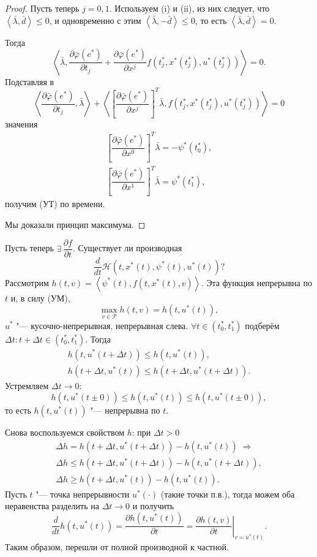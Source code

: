 \documentclass[12pt, a4paper]{article}
\theoremstyle{rusdef}
\renewcommand{\P}{\mathscr{P}} %
\renewcommand{\H}{\mathcal{H}} %
\renewcommand{\d}{\partial} %
\DeclareMathOperator*{\thus}{\Rightarrow} %
\begin{document}
\begin{proof}
  Пусть теперь $j = 0, 1$. Используем (i) и (ii), из них следует, что $\left<\bar{\lambda}, \bar{d} \right> \leqslant 0$, и одновременно с этим $\left<\bar{\lambda}, -\bar{d} \right> \leqslant 0$, то есть $\left<\bar{\lambda}, \bar{d} \right> = 0$.

  Тогда
  \[
    \left< \bar{\lambda}, \dfrac{\d \bar{\varphi}(e^*)}{\d t_j} + \dfrac{\d \bar{\varphi}(e^*)}{\d x^j} f(t_j^*, x^*(t_j^*), u^*(t_j^*)) \right> = 0.
  \]
  Подставляя в
  \[
    \left< \dfrac{\d \bar{\varphi}(e^*)}{\d t_j}, \bar{\lambda} \right> + \left< \left[\dfrac{\d \bar{\varphi}(e^*)}{\d x^j}\right]^T \bar{\lambda}, f(t_j^*, x^*(t_j^*), u^*(t_j^*)) \right> = 0
  \]
  значения
  \begin{gather*}
    \left[\dfrac{\d \bar{\varphi}(e^*)}{\d x^0}\right]^T \bar{\lambda} = -\psi^*(t_0^*),\\
    \left[\dfrac{\d \bar{\varphi}(e^*)}{\d x^1}\right]^T \bar{\lambda} = \psi^*(t_1^*),
  \end{gather*}
  получим (УТ) по времени.

  Мы доказали принцип максимума.
\end{proof}

Пусть теперь $\exists\, \dfrac{\d f}{\d t}$. Существует ли производная 
\[
  \dfrac{d}{dt} \H(t, x^*(t), \psi^*(t), u^*(t))?
\]
Рассмотрим $h(t, v) = \left< \psi^*(t), f(t, x^*(t), v) \right>$. Эта функция непрерывна по $t$ и, в силу (УМ),
\[
  \max\limits_{v \in \P} h(t,v) = h(t, u^*(t)),
\]
$u^*$ "--- кусочно-непрерывная, непрерывная слева.
$\forall t \in (t_0^*, t_1^*)$ подберём $\Delta t \colon t + \Delta t \in (t_0^*, t_1^*)$. Тогда
\begin{gather*}
  h(t, u^*(t + \Delta t)) \leqslant h(t, u^*(t)), \\
  h(t + \Delta t, u^*(t)) \leqslant h(t + \Delta t, u^*(t + \Delta t)).
\end{gather*}
Устремляем $\Delta t \to 0$:
\[
  h(t, u^*(t \pm 0)) \leqslant h(t, u^*(t)) \leqslant h(t, u^*(t \pm 0)),
\]
то есть $h(t, u^*(t))$ "--- непрерывна по $t$.

Снова воспользуемся свойством $h$: при $\Delta t > 0$
\begin{gather*}
  \Delta h = h(t + \Delta t, u^*(t + \Delta t)) - h(t, u^*(t)) \;\thus \\
  \Delta h \leqslant h(t + \Delta t, u^*(t + \Delta t)) - h(t, u^*(t + \Delta t)), \\
  \Delta h \geqslant h(t + \Delta t, u^*(t)) - h(t, u^*(t)).
\end{gather*}
Пусть $t$ "--- точка непрерывности $u^*(\cdot)$ (такие точки п.в.), тогда можем оба неравенства разделить на $\Delta t \to 0$ и получить
\[
  \dfrac{d}{dt} h(t, u^*(t)) = \dfrac{\d h(t, u^*(t))}{\d t} = \left. \dfrac{\d h(t, v)}{\d t} \right\vert_{v = u^*(t)}.
\]
Таким образом, перешли от полной производной к частной.
\end{document}
